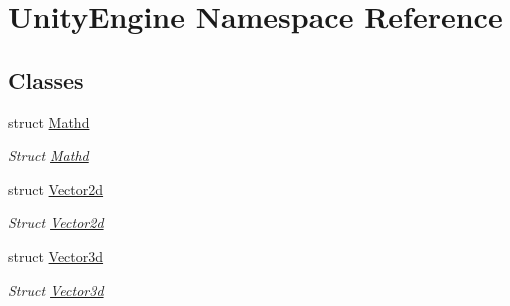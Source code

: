 \hypertarget{namespace_unity_engine}{}\section{Unity\+Engine Namespace Reference}
\label{namespace_unity_engine}
\subsection*{Classes}
\begin{DoxyCompactItemize}
\item 
struct \hyperlink{struct_unity_engine_1_1_mathd}{Mathd}
\begin{DoxyCompactList}\small\item\em Struct \hyperlink{struct_unity_engine_1_1_mathd}{Mathd} \end{DoxyCompactList}\item 
struct \hyperlink{struct_unity_engine_1_1_vector2d}{Vector2d}
\begin{DoxyCompactList}\small\item\em Struct \hyperlink{struct_unity_engine_1_1_vector2d}{Vector2d} \end{DoxyCompactList}\item 
struct \hyperlink{struct_unity_engine_1_1_vector3d}{Vector3d}
\begin{DoxyCompactList}\small\item\em Struct \hyperlink{struct_unity_engine_1_1_vector3d}{Vector3d} \end{DoxyCompactList}\end{DoxyCompactItemize}
